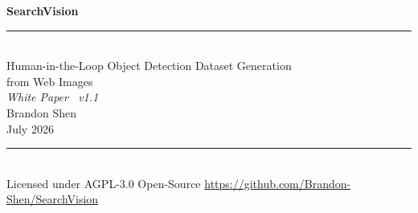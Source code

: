 \documentclass[12pt, letterpaper]{article}
\begin{document}

\begin{titlepage}
  \centering
  \vspace*{3cm}
  {\fontsize{48}{56}\selectfont\bfseries\color{primary} SearchVision}\\[0.8em]
  \textcolor{accent}{\rule{0.6\linewidth}{2pt}}\\[1em]
  {\Large\color{muted} Human-in-the-Loop Object Detection Dataset Generation}\\[0.3em]
  {\Large\color{muted} from Web Images}\\[2em]
  {\large\itshape White Paper \textemdash\ v1.1}\\[0.5em]
  {\normalsize\color{muted} Brandon Shen}\\[0.3em]
  {\normalsize\color{muted} July 2026}\\[3em]
  \textcolor{accent}{\rule{0.3\linewidth}{0.8pt}}\\[1.5em]
  {\small\color{muted}
    Licensed under AGPL-3.0 \quad\textbullet\quad
    Open-Source \quad\textbullet\quad
    \url{https://github.com/Brandon-Shen/SearchVision}
  }
  \vfill
\end{titlepage}

\begin{abstract}
SearchVision is a web-based platform that enables users to create custom object detection
models without writing code. By integrating web search (with intelligent fallback strategies),
automated web scraping, intelligent annotation workflows, and YOLOv8 model training into a 
unified workflow, SearchVision automates the traditionally labor-intensive process of dataset 
collection, annotation, and model training. Unlike existing solutions that focus on individual 
pipeline stages, SearchVision integrates all five stages---search, selection, annotation, 
scraping, and training---into a single interface. The system features a hybrid image selection 
algorithm combining search rank, caption relevance, and visual diversity; validated image downloads;
a held-out validation split; and conservative dataset augmentation using a pre-trained YOLOv8 model.
Google Custom Search is optional because an original-resolution Bing Images fallback is provided.
This whitepaper presents the system's architecture, feature set, technology stack, and practical 
use cases, while also acknowledging current limitations.
\end{abstract}
\end{document}
